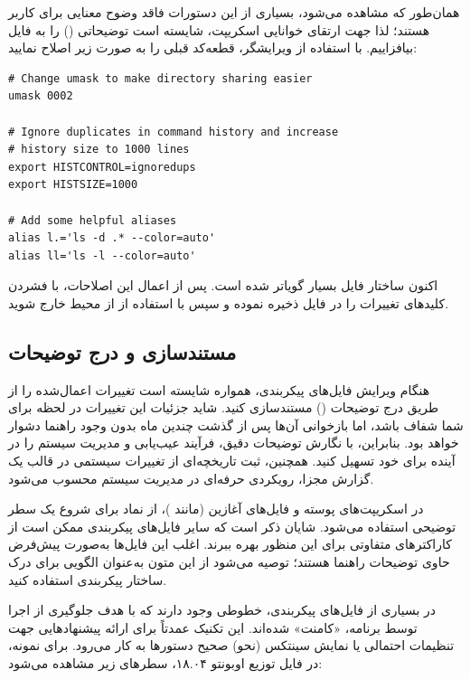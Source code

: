 همان‌طور که مشاهده می‌شود، بسیاری از این دستورات فاقد وضوح معنایی برای کاربر هستند؛ لذا جهت ارتقای خوانایی اسکریپت، شایسته است توضیحاتی () را به فایل  بیافزاییم. با استفاده از ویرایشگر، قطعه‌کد قبلی را به صورت زیر اصلاح نمایید:

\begin{latin}
\begin{lstlisting}
# Change umask to make directory sharing easier
umask 0002

# Ignore duplicates in command history and increase
# history size to 1000 lines
export HISTCONTROL=ignoredups
export HISTSIZE=1000

# Add some helpful aliases
alias l.='ls -d .* --color=auto'
alias ll='ls -l --color=auto'
\end{lstlisting}
\end{latin}

اکنون ساختار فایل بسیار گویاتر شده است. پس از اعمال این اصلاحات، با فشردن کلیدهای  تغییرات را در فایل  ذخیره نموده و سپس با استفاده از  از محیط  خارج شوید.

\subsection{مستندسازی و درج توضیحات}

هنگام ویرایش فایل‌های پیکربندی، همواره شایسته است تغییرات اعمال‌شده را از طریق درج توضیحات () مستندسازی کنید. شاید جزئیات این تغییرات در لحظه برای شما شفاف باشد، اما بازخوانی آن‌ها پس از گذشت چندین ماه بدون وجود راهنما دشوار خواهد بود. بنابراین، با نگارش توضیحات دقیق، فرآیند عیب‌یابی و مدیریت سیستم را در آینده برای خود تسهیل کنید. همچنین، ثبت تاریخچه‌ای از تغییرات سیستمی در قالب یک گزارش مجزا، رویکردی حرفه‌ای در مدیریت سیستم محسوب می‌شود.

در اسکریپت‌های پوسته و فایل‌های آغازین  (مانند )، از نماد \cmd{\#} برای شروع یک سطر توضیحی استفاده می‌شود. شایان ذکر است که سایر فایل‌های پیکربندی ممکن است از کاراکترهای متفاوتی برای این منظور بهره ببرند. اغلب این فایل‌ها به‌صورت پیش‌فرض حاوی توضیحات راهنما هستند؛ توصیه می‌شود از این متون به‌عنوان الگویی برای درک ساختار پیکربندی استفاده کنید.

در بسیاری از فایل‌های پیکربندی، خطوطی وجود دارند که با هدف جلوگیری از اجرا توسط برنامه، «کامنت» شده‌اند. این تکنیک عمدتاً برای ارائه پیشنهادهایی جهت تنظیمات احتمالی یا نمایش سینتکس (نحو) صحیح دستورها به کار می‌رود. برای نمونه، در فایل  توزیع اوبونتو ۱۸.۰۴، سطر‌های زیر مشاهده می‌شود:

